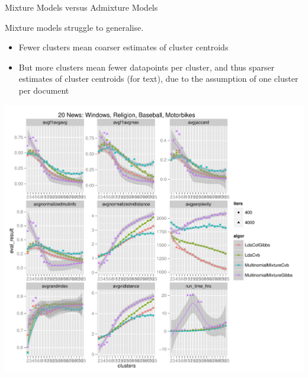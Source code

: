 \documentclass[xcolor=dvipsnames]{beamer}
\begin{document}
\begin{frame}{Mixture Models versus Admixture Models}

 {
Mixture models struggle to generalise.
\begin{itemize}
    \item Fewer clusters mean coarser estimates of cluster centroids
    \item But more clusters mean fewer datapoints per cluster, and thus sparser estimates of cluster centroids (for text), due to the assumption of one cluster per document
\end{itemize}
}

 {
    \includegraphics[trim=12.3cm 7.3cm 0.5cm 7.7cm, clip=true, totalwidth=0.8\textwidth]{Images/20news-2013-03-25.pdf}
}


\end{frame}
\end{document}
